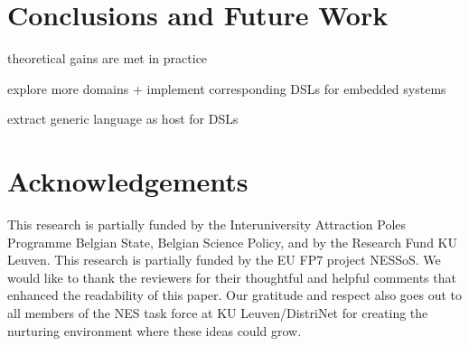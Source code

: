 \documentclass[conference]{IEEEtran}
\begin{document}
\section{Conclusions and Future Work}

theoretical gains are met in practice

explore more domains + implement corresponding DSLs for embedded systems

extract generic language as host for DSLs

\section*{Acknowledgements}

This research is partially funded by the Interuniversity Attraction Poles
Programme Belgian State, Belgian Science Policy, and by the Research Fund KU
Leuven. This research is partially funded by the EU FP7 project NESSoS. We
would like to thank the reviewers for their thoughtful and helpful comments
that enhanced the readability of this paper. Our gratitude and respect also
goes out to all members of the NES task force at KU Leuven/DistriNet for
creating the nurturing environment where these ideas could grow.



\end{document}
